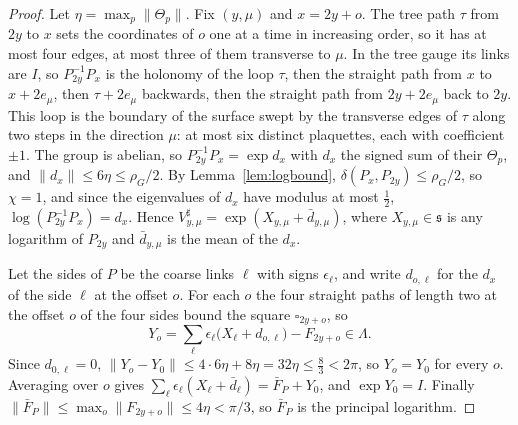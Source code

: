\documentclass[11pt]{amsart}
\theoremstyle{definition}
\theoremstyle{remark}
\numberwithin{equation}{section}
\begin{document}
\begin{proof}
Let $\eta=\max_p\lVert\Theta_p\rVert$. Fix $(y,\mu)$ and $x=2y+o$. The tree
path $\tau$ from $2y$ to $x$ sets the coordinates of $o$ one at a time in
increasing order, so it has at most four edges, at most three of them
transverse to $\mu$. In the tree gauge its links are $I$, so
$P_{2y}^{-1}P_x$ is the holonomy of the loop $\tau$, then the straight path
from $x$ to $x+2e_\mu$, then $\tau+2e_\mu$ backwards, then the straight path
from $2y+2e_\mu$ back to $2y$. This loop is the boundary of the surface
swept by the transverse edges of $\tau$ along two steps in the direction
$\mu$: at most six distinct plaquettes, each with coefficient $\pm1$. The
group is abelian, so $P_{2y}^{-1}P_x=\exp d_x$ with $d_x$ the signed sum of
their $\Theta_p$, and $\lVert d_x\rVert\le6\eta\le\rho_G/2$. By
Lemma~\ref{lem:logbound}, $\delta(P_x,P_{2y})\le\rho_G/2$, so $\chi=1$, and
since the eigenvalues of $d_x$ have modulus at most $\frac12$,
$\log(P_{2y}^{-1}P_x)=d_x$. Hence $V^\sharp_{y,\mu}=\exp(X_{y,\mu}+\bar
d_{y,\mu})$, where $X_{y,\mu}\in\mathfrak s$ is any logarithm of $P_{2y}$
and $\bar d_{y,\mu}$ is the mean of the $d_x$.

Let the sides of $P$ be the coarse links $\ell$ with signs $\epsilon_\ell$,
and write $d_{o,\ell}$ for the $d_x$ of the side $\ell$ at the offset $o$.
For each $o$ the four straight paths of length two at the offset $o$ of the
four sides bound the square $\square_{2y+o}$, so
\[
Y_o=\sum_\ell\epsilon_\ell\bigl(X_\ell+d_{o,\ell}\bigr)-F_{2y+o}\in
\Lambda .
\]
Since $d_{0,\ell}=0$, $\lVert Y_o-Y_0\rVert\le4\cdot6\eta+8\eta=32\eta\le
\frac83<2\pi$, so $Y_o=Y_0$ for every $o$. Averaging over $o$ gives
$\sum_\ell\epsilon_\ell(X_\ell+\bar d_\ell)=\bar F_P+Y_0$, and $\exp Y_0=I$.
Finally $\lVert\bar F_P\rVert\le\max_o\lVert F_{2y+o}\rVert\le4\eta<\pi/3$,
so $\bar F_P$ is the principal logarithm.
\end{proof}
\end{document}
